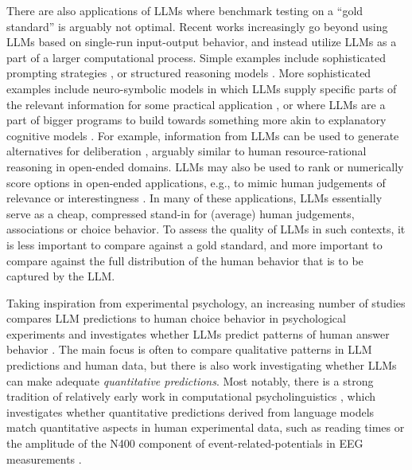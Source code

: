\documentclass[fleqn]{article}
\begin{document}
There are also applications of LLMs where benchmark testing on a ``gold standard'' is arguably not optimal.
Recent works increasingly go beyond using LLMs based on single-run input-output behavior, and instead utilize LLMs as a part of a larger computational process.
Simple examples include sophisticated prompting strategies \citep[e.g.,][]{LiuLiu2022:Generated-Knowl}, or structured reasoning models \citep[e.g.,][]{CreswellShanahan2022:Selection-Infer,GaoMadaan2023:PAL:-Program-ai,ParanjapeLundberg2023:ART:-Automatic-}.
More sophisticated examples include neuro-symbolic models in which LLMs supply specific parts of the relevant information for some practical application , or where LLMs are a part of bigger programs to build towards something more akin to explanatory cognitive models \citep[e.g.,][]{WongGrand2023:From-Word-Model}.
For example, information from LLMs can be used to generate alternatives for deliberation \citep[e.g.][]{TsvilodubCarcassi2024:Towards-Neuro-S}, arguably similar to human resource-rational reasoning in open-ended domains. 
LLMs may also be used to rank or numerically score options in open-ended applications, e.g., to mimic human judgements of relevance or interestingness \citep[e.g.,][]{ParkOBrien2023:Generative-Agen,ZhangLehman2023:OMNI:-Open-ende}.
In many of these applications, LLMs essentially serve as a cheap, compressed stand-in for (average) human judgements, associations or choice behavior.
To assess the quality of LLMs in such contexts, it is less important to compare against a gold standard, and more important to compare against the full distribution of the human behavior that is to be captured by the LLM.

Taking inspiration from experimental psychology, an increasing number of studies compares LLM predictions to human choice behavior in psychological experiments and investigates whether LLMs predict patterns of human answer behavior  \citep[e.g.,][]{BinzSchulz2023:Using-cognitive,Hagendorff2023:Machine-Psychol,ShiffrinMitchell2023:Probing-the-psy}.
The main focus is often to compare qualitative patterns in LLM predictions and human data, but there is also work investigating whether LLMs can make adequate \emph{quantitative predictions}.
Most notably, there is a strong tradition of relatively early work in computational psycholinguistics \citep{MarvinLinzen2018:Targeted-Syntac,HuGauthier2020:A-Systematic-As}, which investigates whether quantitative predictions derived from language models match quantitative aspects in human experimental data, such as reading times \citep{WilcoxVani2021:A-Targeted-Asse} or the amplitude of the N400 component of event-related-potentials in EEG measurements \citep{LindborgRabovsky2021:Meaning-in-brai}.
\end{document}
